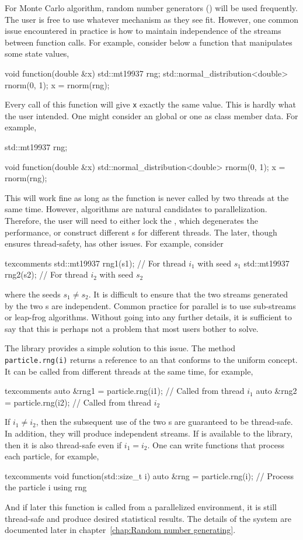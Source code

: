 For Monte Carlo algorithm, random number generators (\rng) will be used
frequently. The user is free to use whatever \rng mechanism as they see fit.
However, one common issue encountered in practice is how to maintain
independence of the \rng streams between function calls. For example, consider
below a function that manipulates some state values,
\begin{cppcode}
  void function(double &x)
  {
      std::mt19937 rng;
      std::normal_distribution<double> rnorm(0, 1);
      x = rnorm(rng);
  }
\end{cppcode}
Every call of this function will give \verb|x| exactly the same value. This is
hardly what the user intended. One might consider an global \rng or one as
class member data. For example,
\begin{cppcode}
  std::mt19937 rng;

  void function(double &x)
  {
      std::normal_distribution<double> rnorm(0, 1);
      x = rnorm(rng);
  }
\end{cppcode}
This will work fine as long as the function is never called by two threads at
the same time. However, \smc algorithms are natural candidates to
parallelization. Therefore, the user will need to either lock the \rng, which
degenerates the performance, or construct different \rng{}s for different
threads. The later, though ensures thread-safety, has other issues. For
example, consider
\begin{cppcode*}{texcomments}
  std::mt19937 rng1(s1); // For thread $i_1$ with seed $s_1$
  std::mt19937 rng2(s2); // For thread $i_2$ with seed $s_2$
\end{cppcode*}
where the seeds $s_1 \ne s_2$. It is difficult to ensure that the two streams
generated by the two \rng{}s are independent. Common practice for parallel \rng
is to use sub-streams or leap-frog algorithms. Without going into any further
details, it is sufficient to say that this is perhaps not a problem that most
users bother to solve.

The library provides a simple solution to this issue. The method
\verb|particle.rng(i)| returns a reference to an \rng that conforms to the
\cppoo uniform \rng concept. It can be called from different threads at the
same time, for example,
\begin{cppcode*}{texcomments}
  auto &rng1 = particle.rng(i1); // Called from thread $i_1$
  auto &rng2 = particle.rng(i2); // Called from thread $i_2$
\end{cppcode*}
If $i_1 \ne i_2$, then the subsequent use of the two \rng{}s are guaranteed to
be thread-safe. In addition, they will produce independent streams. If \tbb is
available to the library, then it is also thread-safe even if $i_1 = i_2$. One
can write functions that process each particle, for example,
\begin{cppcode*}{texcomments}
  void function(std::size_t i)
  {
      auto &rng = particle.rng(i);
      // Process the particle i using rng
  }
\end{cppcode*}
And if later this function is called from a parallelized environment, it is
still thread-safe and produce desired statistical results. The details of the
\rng system are documented later in chapter~\ref{chap:Random number generating}.

